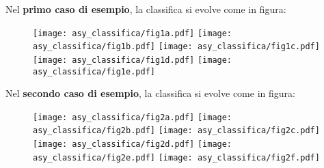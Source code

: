 Nel \textbf{primo caso di esempio}, la classifica si evolve come in figura:

\begin{figure}[H]
	\centering
	\texttt{[image: asy\_classifica/fig1a.pdf]}
	\texttt{[image: asy\_classifica/fig1b.pdf]}
	\texttt{[image: asy\_classifica/fig1c.pdf]}
	\texttt{[image: asy\_classifica/fig1d.pdf]}
	\texttt{[image: asy\_classifica/fig1e.pdf]}
\end{figure}


Nel \textbf{secondo caso di esempio}, la classifica si evolve come in figura:

\begin{figure}[H]
	\centering
	\texttt{[image: asy\_classifica/fig2a.pdf]}
	\texttt{[image: asy\_classifica/fig2b.pdf]}
	\texttt{[image: asy\_classifica/fig2c.pdf]}
	\texttt{[image: asy\_classifica/fig2d.pdf]}
	\texttt{[image: asy\_classifica/fig2e.pdf]}
	\texttt{[image: asy\_classifica/fig2f.pdf]}
\end{figure}

\begin{solution}
	
\end{solution}
